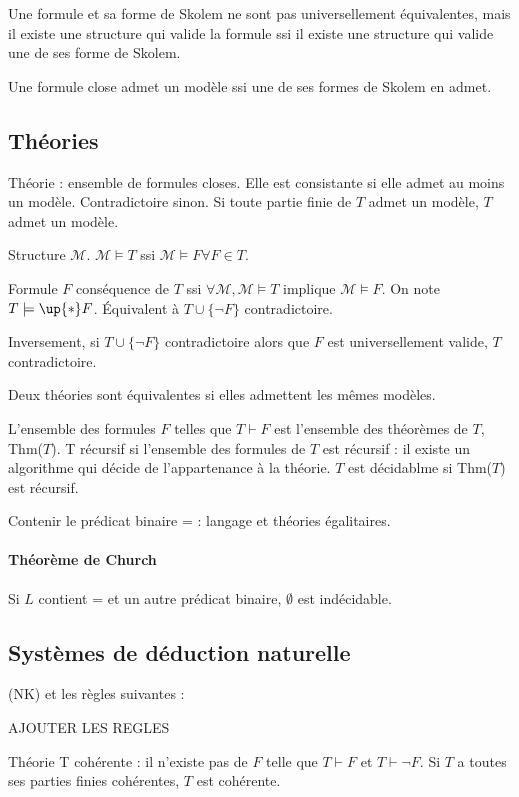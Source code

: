 \documentclass[french]{article}
\begin{document}
Une formule et sa forme de Skolem ne sont pas universellement équivalentes, mais il existe une structure qui valide la formule ssi il existe une structure qui valide une de ses forme de Skolem.

Une formule close admet un modèle ssi une de ses formes de Skolem en admet.

\subsection{Théories}
Théorie : ensemble de formules closes. Elle est consistante si elle admet au moins un modèle. Contradictoire sinon. Si toute partie finie de $T$ admet un modèle, $T$ admet un modèle.

Structure $\mathcal{M}$. $\mathcal{M}\models T$ ssi $\mathcal{M}\models F\forall F\in T$.

Formule $F$ conséquence de $T$ ssi $\forall\mathcal{M}, \mathcal{M}\models T$ implique $\mathcal{M}\models F$. On note $T\models\up{*} F$. Équivalent à $T\cup\{\neg F\}$ contradictoire.

Inversement, si $T\cup\{\neg F\}$ contradictoire alors que $F$ est universellement valide, $T$ contradictoire.

Deux théories sont équivalentes si elles admettent les mêmes modèles.

L'ensemble des formules $F$ telles que $T\vdash F$ est l'ensemble des théorèmes de $T$, Thm($T$). T récursif si l'ensemble des formules de $T$ est récursif : il existe un algorithme qui décide de l'appartenance à la théorie. $T$ est décidablme si Thm($T$) est récursif.

Contenir le prédicat binaire = : langage et théories égalitaires.

\paragraph{Théorème de Church} Si $L$ contient = et un autre prédicat binaire, $\emptyset$ est indécidable.


\subsection{Systèmes de déduction naturelle}
(NK) et les règles suivantes :

AJOUTER LES REGLES

Théorie T cohérente : il n'existe pas de $F$ telle que $T\vdash F$ et $T\vdash\neg F$. Si $T$ a toutes ses parties finies cohérentes, $T$ est cohérente.
\end{document}

